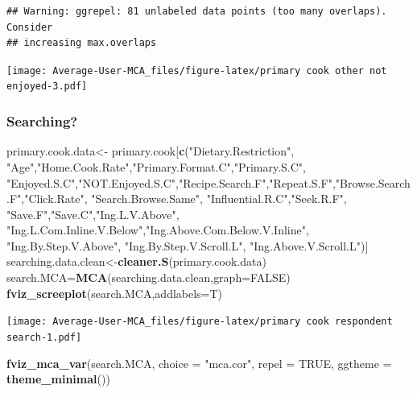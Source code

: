 \documentclass[
]{article}
\newenvironment{Shaded}{\begin{snugshade}}{\end{snugshade}}
\newcommand{\DataTypeTok}[1]{\textcolor[rgb]{0.13,0.29,0.53}{#1}}
\newcommand{\KeywordTok}[1]{\textcolor[rgb]{0.13,0.29,0.53}{\textbf{#1}}}
\newcommand{\NormalTok}[1]{#1}
\newcommand{\OtherTok}[1]{\textcolor[rgb]{0.56,0.35,0.01}{#1}}
\newcommand{\StringTok}[1]{\textcolor[rgb]{0.31,0.60,0.02}{#1}}
\begin{document}
\begin{verbatim}
## Warning: ggrepel: 81 unlabeled data points (too many overlaps). Consider
## increasing max.overlaps
\end{verbatim}

\texttt{[image: Average-User-MCA\_files/figure-latex/primary cook other not enjoyed-3.pdf]}

\hypertarget{searching-3}{%
\subsubsection{Searching?}\label{searching-3}}

\begin{Shaded}
\begin{Highlighting}[]
\NormalTok{primary.cook.data<-}\StringTok{ }\NormalTok{primary.cook[}\KeywordTok{c}\NormalTok{(}\StringTok{"Dietary.Restriction"}\NormalTok{, }\StringTok{"Age"}\NormalTok{,}\StringTok{"Home.Cook.Rate"}\NormalTok{,}\StringTok{"Primary.Format.C"}\NormalTok{,}\StringTok{"Primary.S.C"}\NormalTok{,}
            \StringTok{"Enjoyed.S.C"}\NormalTok{,}\StringTok{"NOT.Enjoyed.S.C"}\NormalTok{,}\StringTok{"Recipe.Search.F"}\NormalTok{,}\StringTok{"Repeat.S.F"}\NormalTok{,}\StringTok{"Browse.Search.F"}\NormalTok{,}\StringTok{"Click.Rate"}\NormalTok{,}
            \StringTok{"Search.Browse.Same"}\NormalTok{, }\StringTok{"Influential.R.C"}\NormalTok{,}\StringTok{"Seek.R.F"}\NormalTok{, }\StringTok{"Save.F"}\NormalTok{,}\StringTok{"Save.C"}\NormalTok{,}\StringTok{"Ing.L.V.Above"}\NormalTok{,}
            \StringTok{"Ing.L.Com.Inline.V.Below"}\NormalTok{,}\StringTok{"Ing.Above.Com.Below.V.Inline"}\NormalTok{,  }\StringTok{"Ing.By.Step.V.Above"}\NormalTok{,  }\StringTok{"Ing.By.Step.V.Scroll.L"}\NormalTok{,}
            \StringTok{"Ing.Above.V.Scroll.L"}\NormalTok{)]}
\NormalTok{searching.data.clean<-}\KeywordTok{cleaner.S}\NormalTok{(primary.cook.data)}
\NormalTok{search.MCA=}\KeywordTok{MCA}\NormalTok{(searching.data.clean,}\DataTypeTok{graph=}\OtherTok{FALSE}\NormalTok{)}
\KeywordTok{fviz_screeplot}\NormalTok{(search.MCA,}\DataTypeTok{addlabels=}\NormalTok{T)}
\end{Highlighting}
\end{Shaded}

\texttt{[image: Average-User-MCA\_files/figure-latex/primary cook respondent search-1.pdf]}

\begin{Shaded}
\begin{Highlighting}[]
\KeywordTok{fviz_mca_var}\NormalTok{(search.MCA, }\DataTypeTok{choice =} \StringTok{"mca.cor"}\NormalTok{, }\DataTypeTok{repel =} \OtherTok{TRUE}\NormalTok{,}
             \DataTypeTok{ggtheme =} \KeywordTok{theme_minimal}\NormalTok{())}
\end{Highlighting}
\end{Shaded}
\end{document}
